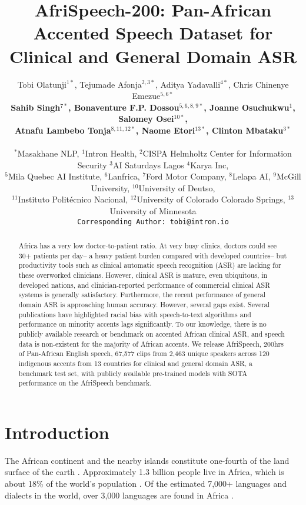 \documentclass[11pt,a4paper]{article}
\title{AfriSpeech-200: Pan-African Accented Speech Dataset for Clinical and General Domain ASR}
\author{\normalsize Tobi Olatunji$^{1*}$, Tejumade Afonja$^{2,3*}$, Aditya Yadavalli$^{4*}$, Chris Chinenye Emezue$^{5,6*}$ \\ \textbf{\normalsize Sahib Singh$^{7*}$, Bonaventure F.P. Dossou$^{5,6,8,9*}$, Joanne Osuchukwu$^{1}$,  Salomey Osei$^{10*}$, }\\
\textbf{\normalsize Atnafu Lambebo Tonja$^{8,11,12*}$, Naome Etori$^{13*}$, Clinton Mbataku$^{3*}$}\\ 
\\
\footnotesize
$^*$Masakhane NLP, $^1$Intron Health, $^2$CISPA Helmholtz Center for Information Security $^{3}$AI Saturdays Lagos $^4$Karya Inc,  \\
\footnotesize 
$^5$Mila Quebec AI Institute, 
$^6$Lanfrica, $^7$Ford Motor Company, $^8$Lelapa AI, $^9$McGill University, $^{10}$University of Deutso, \\
\footnotesize 
$^{11}$Instituto Politécnico Nacional, $^{12}$University of Colorado Colorado Springs, $^{13}$University of Minnesota\\
\texttt{Corresponding Author: tobi@intron.io}
}
\date{}
\newcommand{\taclpaper}{final version\xspace}
\newcommand{\taclpapers}{final versions\xspace}
\newcommand{\taclpaper}{submission\xspace}
\newcommand{\taclpapers}{{\taclpaper}s\xspace}
\begin{document}
\maketitle
\begin{abstract}
Africa has a very low doctor-to-patient ratio. At very busy clinics, doctors could see 30+ patients per day-- a heavy patient burden compared with developed countries-- but productivity tools such as clinical automatic speech recognition (ASR) are lacking for these overworked clinicians. However, clinical ASR is mature, even ubiquitous, in developed nations, and clinician-reported performance of commercial clinical ASR systems is generally satisfactory. Furthermore, the recent performance of general domain ASR is approaching human accuracy. However, several gaps exist. Several publications have highlighted racial bias with speech-to-text algorithms and performance on minority accents lags significantly. To our knowledge, there is no publicly available research or benchmark on accented African clinical ASR, and speech data is non-existent for the majority of African accents. We release AfriSpeech, 200hrs of Pan-African English speech, 67,577 clips from 2,463 unique speakers across 120 indigenous accents from 13 countries for clinical and general domain ASR, a benchmark test set, with publicly available pre-trained models with SOTA performance on the AfriSpeech benchmark.
\end{abstract}


\section{Introduction}

The African continent and the nearby islands constitute one-fourth of the land surface of the earth \cite{lodhi1993language}. Approximately 1.3 billion people live in Africa, which is about 18\% of the world's population \cite{enwiki:1132870977}. Of the estimated 7,000+ languages and dialects in the world, over 3,000 languages are found in Africa \cite{enwiki:1133594141, heine2000african}. %
\end{document}
